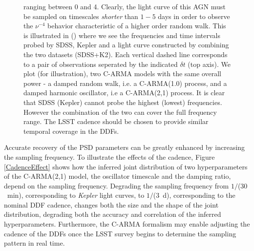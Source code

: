 \begin{figure}
{  ranging between 0 and 4. Clearly, the light curve of this AGN must be sampled on 
  timescales {\em shorter} than $1-5$ days in order to observe the $\nu^{-4}$ behavior
  characteristic of a higher order random walk. This is illustrated in () 
  where we see the frequencies and time intervals probed by SDSS, Kepler and a light curve 
  constructed by combining the two datasets (SDSS+K2). Each vertical dashed line corresponds to
  a pair of observations seperated by the indicated $\delta t$ (top axis). We plot (for 
  illustration), two C-ARMA models with the same overall power - a damped random walk, i.e. a 
  C-ARMA(1.0) process, and a damped harmonic oscillator, i.e a C-ARMA(2,1) process. 
  It is clear that SDSS (Kepler) cannot probe the highest (lowest) frequencies. However the 
  combination of the two can cover the full frequency range. The LSST cadence should be chosen 
  to provide similar temporal coverage in the DDFs.}
  \label{PSDvsFreq}
\end{figure}

Accurate recovery of the PSD parameters can be greatly enhanced by increasing the
sampling frequency. To illustrate the effects of the cadence, Figure \ref{CadenceEffect}
shows how the inferred joint distribution of two hyperparameters of the C-ARMA(2,1)
model, the oscillator timescale and the damping ratio, depend on the sampling frequency.
Degrading the sampling frequency from $1/$($30$~min), corresponding to {\em Kepler}
light curves, to $1/$($3$~d), corresponding to the nominal DDF cadence, changes both
the size and the shape of the joint distribution, degrading both the accuracy and
correlation of the inferred hyperparameters.
%
Furthermore, the C-ARMA formalism may enable adjusting the cadence of the DDFs once
the LSST survey begins to determine the sampling pattern in real time.

